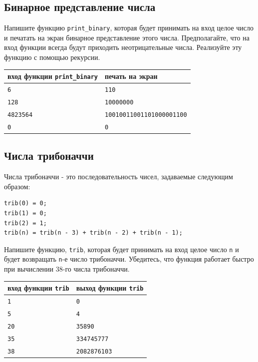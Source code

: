 \documentclass[10pt]{article}
\begin{document}
 
\subsection{Бинарное представление числа}
Напишите функцию \texttt{print\_binary}, которая будет принимать на вход целое число и печатать на экран бинарное представление этого числа. Предполагайте, что на вход функции всегда будут приходить неотрицательные числа.
Реализуйте эту функцию с помощью рекурсии.
 
\begin{center}
\begin{tabular}{ l | l }
 вход функции \texttt{print\_binary} & печать на экран \\ \hline
 \texttt{6} & \texttt{110}  \\
 \texttt{128} & \texttt{10000000}  \\  
 \texttt{4823564} & \texttt{10010011001101000001100}  \\
 \texttt{0} & \texttt{0}  \\
\end{tabular}
\end{center} 
 
 
\subsection{Числа трибоначчи}
Числа трибоначчи - это последовательность чисел, задаваемые следующим образом:
\begin{verbatim}
trib(0) = 0; 
trib(1) = 0; 
trib(2) = 1;
trib(n) = trib(n - 3) + trib(n - 2) + trib(n - 1);
\end{verbatim}
Напишите функцию, \texttt{trib}, которая будет принимать на вход целое число \texttt{n} и будет возвращать \texttt{n}-е число трибоначчи. Убедитесь, что функция работает быстро при вычислении 38-го числа трибоначчи.

\begin{center}
\begin{tabular}{ l | l }
 вход функции \texttt{trib} & выход функции \texttt{trib} \\ \hline
 \texttt{1} & \texttt{0}  \\
 \texttt{5} & \texttt{4}  \\
 \texttt{20} & \texttt{35890}  \\
 \texttt{35} & \texttt{334745777}  \\
 \texttt{38} & \texttt{2082876103}  \\
\end{tabular}
\end{center} 
 
\end{document}
